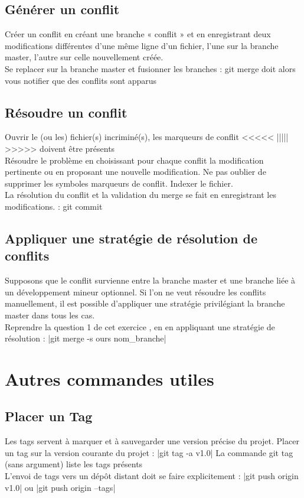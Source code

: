 \subsection{Générer un conflit}
Créer un conflit en créant une branche « conflit » et en enregistrant deux modifications
différentes d'une même ligne d'un fichier, l'une sur la branche master, l'autre sur celle
nouvellement créée.\\
 Se replacer sur la branche master et fusionner les branches : git merge doit alors vous notifier
que des conflits sont apparus
\subsection{Résoudre un conflit}
Ouvrir le (ou les) fichier(s) incriminé(s), les marqueurs de conflit <<<<< ||||| >>>>> doivent être
présents\\
Résoudre le problème en choisissant pour chaque conflit la modification pertinente ou en
proposant une nouvelle modification. Ne pas oublier de supprimer les symboles marqueurs de
conflit. Indexer le fichier.\\
La résolution du conflit et la validation du merge se fait en enregistrant les modifications. : git
commit
\subsection{Appliquer une stratégie de résolution de conflits}
Supposons que le conflit survienne entre la branche master et une branche liée à un
développement mineur optionnel. Si l'on ne veut résoudre les conflits manuellement, il est
possible d'appliquer une stratégie privilégiant la branche master dans tous les cas.\\
Reprendre la question 1 de cet exercice , en en appliquant une stratégie de résolution :
|git merge -s ours nom_branche|
\section{Autres commandes utiles}
\subsection{Placer un Tag}
Les tags servent à marquer et à sauvegarder une version précise du projet. Placer un tag sur la
version courante du projet :
|git tag -a v1.0|
La commande git tag (sans argument) liste les tags présents\\
L'envoi de tags vers un dépôt distant doit se faire explicitement :
|git push origin v1.0|
 ou |git push origin –tags|
